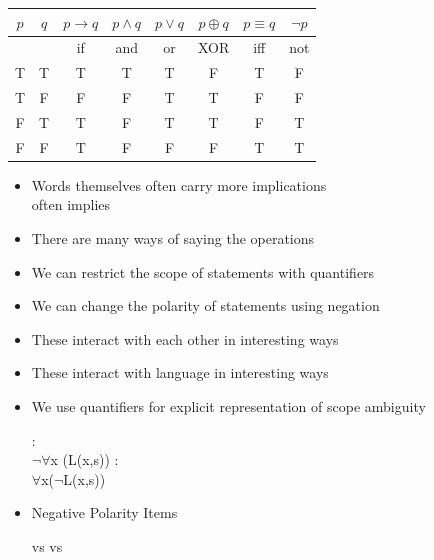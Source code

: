 \documentclass[a4paper,landscape,headrule,footrule,xetex]{foils}
\begin{document}
\begin{center}
  \begin{tabular}{|c|c|c|c|c|c|c|c|}
    \hline
    $p$ & $q$ & $p \rightarrow q$ & $p \wedge q$ & $p \vee q$ 
    & $p \oplus q$ & $p \equiv q$ & $\neg p$\\
    \hline
    &   & if & and & or &  XOR & iff & not  \\
    \hline
    T & T & T & T & T & F & T & F \\ 
    T & F & F & F & T & T & F & F \\  
    F & T & T & F & T & T & F & T\\ 
    F & F & T & F & F & F & T & T\\ \hline
  \end{tabular}
  \begin{itemize}
  \item Words themselves often carry more implications
    \\  often implies 
  \item There are many ways of saying the operations
  \end{itemize}
\end{center}



\begin{itemize} \addtolength{\itemsep}{-1em} 
\item We can restrict the scope of statements with quantifiers
\item We can change the polarity of statements using negation
\item These interact with each other in interesting ways
\item These interact with language in interesting ways
\item We use quantifiers for explicit representation of scope ambiguity
  \begin{exe}
    \ex {}
    \begin{xlist}
          \ex {}:  
          \\ $\neg\forall$x (L(x,s))
          \ex {}: 
          \\ $\forall$x($\neg$L(x,s))
    \end{xlist}
  \end{exe}
\item Negative Polarity Items
 \begin{exe}
   \ex {} vs 
\ex {} vs
 \end{exe}
 
\end{itemize}
\end{document}
